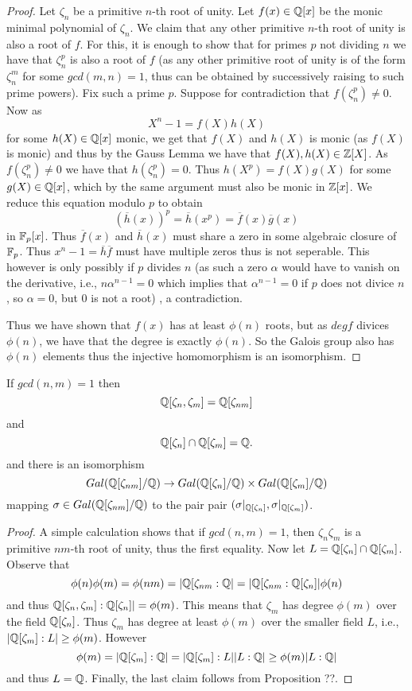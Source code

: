 \documentclass[twoside, a4paper, 10pt]{amsart}
\begin{document}
\begin{proof} Let $\zeta_n$ be a primitive $n$-th root of unity. Let $f(x) \in \mathbb{Q}[x]$ be the monic minimal polynomial of $\zeta_n$. We claim that any other primitive $n$-th root of unity is also a root of $f$. For this, it is enough to show that for primes $p$ not dividing $n$ we have that $\zeta_n^p$ is also a root of $f$ (as any other primitive root of unity is of the form $\zeta_n^m$ for some $gcd(m,n)=1$, thus can be obtained by successively raising to such prime powers). Fix such a prime $p$. Suppose for contradiction that $f(\zeta_n^p) \neq 0$. Now as $$X^n - 1 = f(X)h(X)$$ for some $h(X) \in \mathbb{Q}[x]$ monic, we get that $f(X)$ and $h(X)$ is monic (as $f(X)$ is monic) and thus by the Gauss Lemma we have that $f(X), h(X) \in \mathbb{Z}[X]$. As $f(\zeta_n^p) \neq 0$ we have that $h(\zeta_n^p) = 0$. Thus $h(X^p) = f(X)g(X)$ for some $g(X) \in \mathbb{Q}[x]$, which by the same argument must also be monic in $\mathbb{Z}[x]$. We reduce this equation modulo $p$ to obtain $$(\overline{h}(x))^p = \overline{h}(x^p) = \overline{f}(x)\overline{g}(x)$$ in $\mathbb{F}_p[x]$. Thus $\overline{f}(x)$ and $\overline{h}(x)$ must share a zero in some algebraic closure of $\mathbb{F}_p$. Thus $x^n-1 = \overline{h}\overline{f}$ must have multiple zeros thus is not seperable. This however is only possibly if $p$ divides $n$ (as such a zero $\alpha$ would have to vanish on the derivative, i.e.,  $n\alpha^{n-1} = 0$ which implies that $\alpha^{n-1} = 0$ if $p$ does not divice $n$, so $\alpha=0$, but $0$ is not a root) , a contradiction.

Thus we have shown that $f(x)$ has at least $\phi(n)$ roots, but as $deg f$ divices $\phi(n)$, we have that the degree is exactly $\phi(n)$. So the Galois group also has $\phi(n)$ elements thus the injective homomorphism is an isomorphism. \end{proof}

\begin{prop} If $gcd(n,m)=1$ then $$\mathbb{Q}[\zeta_n, \zeta_m] = \mathbb{Q}[\zeta_{nm}]$$ and $$\mathbb{Q}[\zeta_n] \cap \mathbb{Q}[\zeta_m] = \mathbb{Q}.$$ and there is an isomorphism $$Gal(\mathbb{Q}[\zeta_{nm}]/\mathbb{Q}) \to Gal(\mathbb{Q}[\zeta_n]/\mathbb{Q}) \times Gal(\mathbb{Q}[\zeta_m]/\mathbb{Q})$$ mapping $\sigma \in Gal(\mathbb{Q}[\zeta_{nm}]/\mathbb{Q})$ to the pair pair $(\sigma|_{\mathbb{Q}[\zeta_n]}, \sigma|_{\mathbb{Q}[\zeta_m]})$.

\end{prop}

\begin{proof} A simple calculation shows that if $gcd(n,m)=1$, then $\zeta_n\zeta_m$ is a primitive $nm$-th root of unity, thus the first equality. Now let $L = \mathbb{Q}[\zeta_n] \cap \mathbb{Q}[\zeta_m]$. Observe that $$\phi(n)\phi(m) = \phi(nm) = |\mathbb{Q}[\zeta_{nm}:\mathbb{Q}| = |\mathbb{Q}[\zeta_{nm}:\mathbb{Q}[\zeta_n]| \phi(n)$$ and thus $\mathbb{Q}[\zeta_{n}, \zeta_m]:\mathbb{Q}[\zeta_n]| = \phi(m)$. This means that $\zeta_m$ has degree $\phi(m)$ over the field $\mathbb{Q}[\zeta_n]$. Thus $\zeta_m$ has degree at least $\phi(m)$ over the smaller field $L$, i.e., $|\mathbb{Q}[\zeta_m]:L| \geq \phi(m)$. However $$\phi(m) = |\mathbb{Q}[\zeta_m]:\mathbb{Q}| = |\mathbb{Q}[\zeta_m]:L||L:\mathbb{Q}| \geq \phi(m) |L:\mathbb{Q}|$$ and thus $L = \mathbb{Q}$. Finally, the last claim follows from Proposition ??.  \end{proof}
\end{document}
